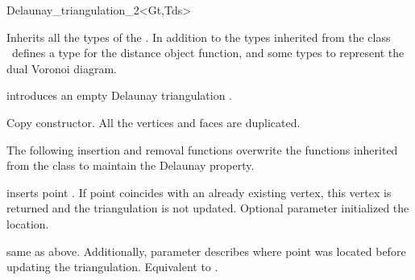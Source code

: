 \begin{ccClassTemplate} {Delaunay_triangulation_2<Gt,Tds>}
\ccInheritsFrom


\ccTypes
{}
\ccThreeToTwo

Inherits all the types of the .
In addition to the types inherited from 
the class \ccClassTemplateName\
defines a type for the distance object function, and 
some types to
represent the dual Voronoi diagram.


\ccGlue
{}
\ccGlue
{}

\ccCreation
{}
\ccThreeToTwo

{introduces an empty Delaunay triangulation \ccVar.}


{Copy constructor. All the vertices and faces are duplicated.}



The following insertion and removal  functions overwrite
the functions inherited from the class
 to maintain the Delaunay property.




{inserts  point .
If point \ccc{p} coincides with an already existing vertex, this 
vertex is returned and the triangulation is not updated.
Optional parameter  initialized the location.
}

{same as above. Additionally, parameter \ccc{lt} describes where point
 \ccc{p} was located before updating the triangulation.}
{Equivalent to .}


\end{ccClassTemplate}
